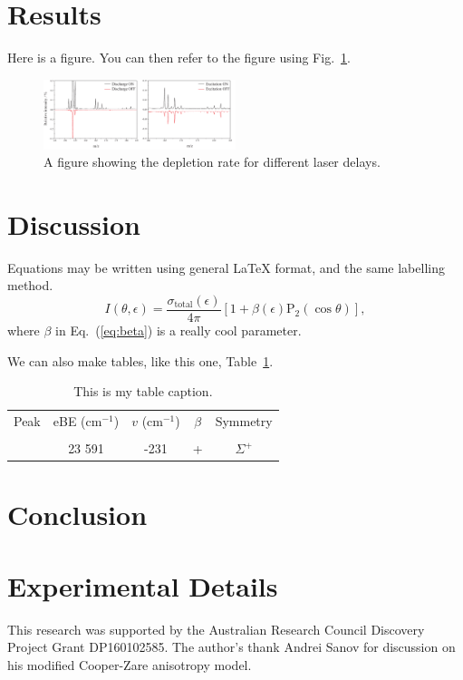 \documentclass[journal=jacsat,manuscript=article,layout=onecolumn]{achemso}
\begin{document}
\section{Results}
Here is a figure. You can then refer to the figure using Fig.~\ref{fig1-delay}.
\begin{figure}
	\includegraphics[width=0.5\textwidth]{Figures/discharge-exc}
	\caption{A figure showing the depletion rate for different laser delays.}
	\label{fig1-delay}
\end{figure}

\section{Discussion}
Equations may be written using general LaTeX format, and the same labelling method.
\begin{equation}
I(\theta,\epsilon) = \frac{\sigma_{\text{total}}(\epsilon)}{4\pi}[1+\beta(\epsilon)\text{P}_2(\cos\theta)],
\label{eq:beta}
\end{equation}
where $\beta$ in Eq.~(\ref{eq:beta}) is a really cool parameter.

We can also make tables, like this one, Table~\ref{tab:C2H}.
\begin{table}
	\caption{This is my table caption.} \label{tab:C2H}
	\begin{tabular}{c c c c c}
		\hline Peak & eBE (cm$^{-1}$) & $v$ (cm$^{-1}$) & $\beta$ & Symmetry \\ 
		& & & & \\\hline \hline
		& 23 591 & -231 & + & $\Sigma^+$ 
	\end{tabular}
\end{table}

\section{Conclusion}

\section{Experimental Details}


\begin{acknowledgement}
	This research was supported by the Australian Research Council Discovery
	Project Grant DP160102585. The author's thank Andrei Sanov for discussion on his modified Cooper-Zare anisotropy model.
\end{acknowledgement}




\end{document}
